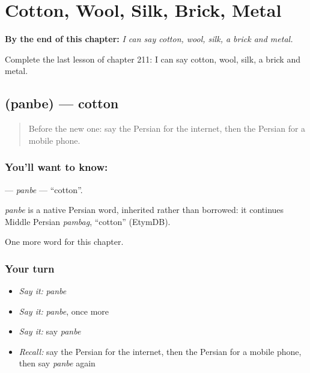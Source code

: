 
\chapter{Cotton, Wool, Silk, Brick, Metal}
\label{ch:fa-cotton-wool-silk-brick-metal}

\begin{chapteropening}
\textbf{By the end of this chapter:} \emph{I can say cotton, wool, silk, a brick and metal.}

Complete the last lesson of chapter 211: I can say cotton, wool, silk, a brick and metal.
\end{chapteropening}

\section[\texorpdfstring{\fa{پنبه} (panbe)}{پنبه (panbe)}]{ (panbe) — cotton}

\label{lesson:FA-C211-panbe}



\begin{quote}
Before the new one: say the Persian for the internet, then the Persian for a mobile phone.
\end{quote}

\subsection*{You'll want to know: }
\textbf{} — \emph{panbe} — \textquotedblleft{}cotton\textquotedblright{}.

\begin{cousinweb}
\emph{panbe} is a native Persian word, inherited rather than borrowed: it continues Middle Persian \emph{pambag}, \textquotedblleft{}cotton\textquotedblright{} (EtymDB).
\end{cousinweb}

\begin{grammarlens}[title={What you've built}]
One more word for this chapter.
\end{grammarlens}

\subsection*{Your turn}
\begin{itemize}
\raggedright
  \item \emph{Say it:} \emph{panbe}
  \item \emph{Say it:} \emph{panbe}, once more
  \item \emph{Say it:} say \emph{panbe}
  \item \emph{Recall:} say the Persian for the internet, then the Persian for a mobile phone, then say \emph{panbe} again
\end{itemize}

